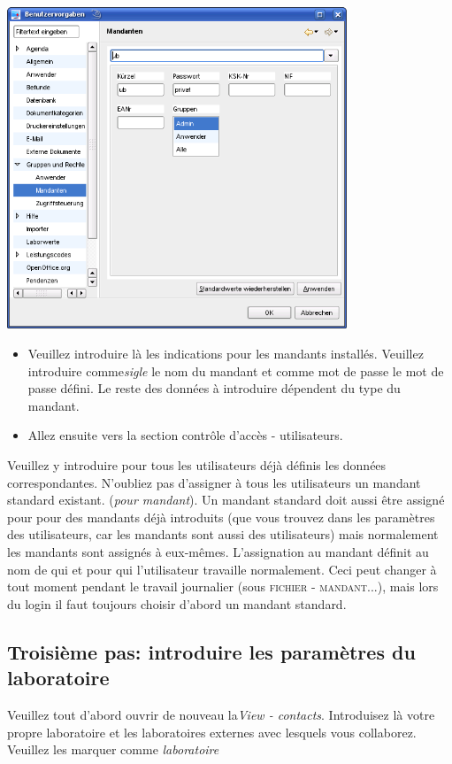 \includegraphics[width=4in]{images/grundkonfmand.png}
\begin{itemize}
 \item Veuillez introduire là les indications pour les mandants installés. Veuillez introduire comme\textit{sigle} le nom du mandant et comme mot de passe le mot de passe défini. Le reste des données à introduire dépendent du type du mandant.
 \item Allez ensuite vers la section contrôle d'accès - utilisateurs.
\end{itemize}

Veuillez y introduire pour tous les utilisateurs déjà définis les données correspondantes. N'oubliez pas d'assigner à tous les utilisateurs un mandant standard existant. (\textit{pour mandant}). Un mandant standard doit aussi être assigné pour pour des mandants déjà introduits (que vous trouvez dans les paramètres des utilisateurs, car les mandants sont aussi des utilisateurs) mais normalement les mandants sont assignés à eux-mêmes. L'assignation au mandant définit au nom de qui et pour qui l'utilisateur travaille normalement. Ceci peut changer à tout moment pendant le travail journalier (sous \textsc{fichier - mandant}...), mais lors du login il faut toujours choisir d'abord un mandant standard.

\subsection{Troisième pas: introduire les paramètres du laboratoire}
Veuillez tout d'abord ouvrir de nouveau la\textit{View - contacts}. Introduisez là votre propre laboratoire et les laboratoires externes avec lesquels vous collaborez.
Veuillez les marquer comme \textit{laboratoire}

